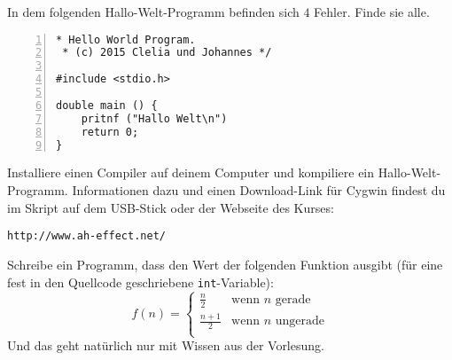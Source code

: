 \documentclass{uebungszettel}
\begin{document}
\begin{aufg}
In dem folgenden Hallo-Welt-Programm befinden sich
$4$ Fehler.
Finde sie alle.

\begin{codelisting}
\begin{lstlisting}[numbers=left,numberstyle=\tiny,frame=tlrb,showstringspaces=false]
 * Hello World Program.
 * (c) 2015 Clelia und Johannes */

#include <stdio.h>

double main () {
    pritnf ("Hallo Welt\n")
    return 0;
}
\end{lstlisting}
\end{codelisting}
\end{aufg}

\begin{aufg}
Installiere einen Compiler auf deinem Computer und kompiliere ein Hallo-Welt-Programm. Informationen dazu und einen Download-Link für Cygwin findest du im Skript auf dem USB-Stick oder der Webseite des Kurses:
\begin{center}
	\verb|http://www.ah-effect.net/ |
\end{center}
\end{aufg}

\begin{aufg}
Schreibe ein Programm, dass den Wert der folgenden Funktion ausgibt (für eine fest in den Quellcode geschriebene \verb|int|-Variable):
\[
	f(n) = \left\{ \begin{array}{ll}
	\frac{n}{2} & \text{wenn } n \text{ gerade} \\
	\frac{n+1}{2} & \text{wenn } n \text{ ungerade} \\
	\end{array}
	\right.
\]
Und das geht natürlich nur mit Wissen aus der Vorlesung.
\end{aufg}
\end{document}
